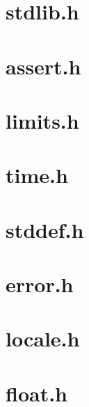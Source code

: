 \documentclass[UTF8,a4paper,12pt]{ctexbook}
\begin{document}
\chapter{stdlib.h} 

\chapter{assert.h}

\chapter{limits.h}

\chapter{time.h}

\chapter{stddef.h} 

\chapter{error.h}

\chapter{locale.h}

\chapter{float.h}
		    
\end{document}
